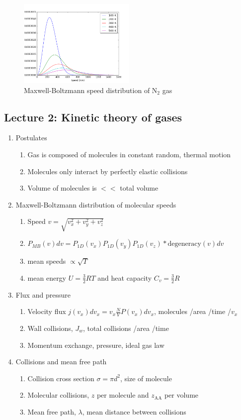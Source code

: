 \documentclass[11pt]{article}
\begin{document}
\begin{figure}[htbp]
\centering
\includegraphics[width=0.5\textwidth]{./Images/MB.png}
\caption{Maxwell-Boltzmann speed distribution of N\(_2\) gas}
\end{figure}

\subsection{Lecture 2: Kinetic theory of gases}
\label{sec:org5602d39}
\begin{enumerate}
\item Postulates
\begin{enumerate}
\item Gas is composed of molecules in constant random, thermal motion
\item Molecules only interact by perfectly elastic collisions
\item Volume of molecules is \(<<\) total volume
\end{enumerate}
\item Maxwell-Boltzmann distribution of molecular speeds
\begin{enumerate}
\item Speed \(v=\sqrt{v_x^2+v_y^2+v_z^2}\)
\item \(P_{MB}(v) dv = P_{1D}(v_x) P_{1D}(v_y) P_{1D}(v_z) * \text{degeneracy}(v) dv\)
\item mean speeds \(\propto \sqrt{T}\)
\item mean energy \(U=\frac{3}{2} RT\) and heat capacity \(C_v=\frac{3}{2} R\)
\end{enumerate}
\item Flux and pressure
\begin{enumerate}
\item Velocity flux \(j(v_x) dv_x= v_x \frac{N}{V}P(v_x)dv_x\), molecules /area /time /\(v_x\)
\item Wall collisions, \(J_w\), total collisions /area /time
\item Momentum exchange, pressure, ideal gas law
\end{enumerate}
\item Collisions and mean free path
\begin{enumerate}
\item Collision cross section \(\sigma=\pi d^2\), size of molecule
\item Molecular collisions, \(z\) per molecule and \(z_{\mathrm{AA}}\) per volume
\item Mean free path, \(\lambda\), mean distance between collisions
\end{enumerate}
\end{enumerate}
\end{document}
